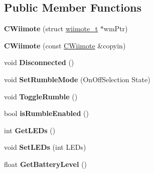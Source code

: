 \subsection*{Public Member Functions}
\begin{DoxyCompactItemize}
\item 
\hypertarget{class_c_wiimote_aea8deb92b4f4c23ff5f619f92f5740bb}{{\bfseries C\-Wiimote} (struct \hyperlink{structwiimote__t}{wiimote\-\_\-t} $\ast$wm\-Ptr)}\label{class_c_wiimote_aea8deb92b4f4c23ff5f619f92f5740bb}

\item 
\hypertarget{class_c_wiimote_af907ec89113a3e2ec6f992bb381c6253}{{\bfseries C\-Wiimote} (const \hyperlink{class_c_wiimote}{C\-Wiimote} \&copyin)}\label{class_c_wiimote_af907ec89113a3e2ec6f992bb381c6253}

\item 
\hypertarget{class_c_wiimote_a39252c75229d1bc9d2acc126304a7ca6}{void {\bfseries Disconnected} ()}\label{class_c_wiimote_a39252c75229d1bc9d2acc126304a7ca6}

\item 
\hypertarget{class_c_wiimote_a4945392c6bcfa461bdcc6b8f5ff25ba1}{void {\bfseries Set\-Rumble\-Mode} (On\-Off\-Selection State)}\label{class_c_wiimote_a4945392c6bcfa461bdcc6b8f5ff25ba1}

\item 
\hypertarget{class_c_wiimote_af1908b383e4a700c270af461bf1b209d}{void {\bfseries Toggle\-Rumble} ()}\label{class_c_wiimote_af1908b383e4a700c270af461bf1b209d}

\item 
\hypertarget{class_c_wiimote_a332038d26d6b67d6a566cc1789bae118}{bool {\bfseries is\-Rumble\-Enabled} ()}\label{class_c_wiimote_a332038d26d6b67d6a566cc1789bae118}

\item 
\hypertarget{class_c_wiimote_a288872e2efc61d986b4b49e4b868460b}{int {\bfseries Get\-L\-E\-Ds} ()}\label{class_c_wiimote_a288872e2efc61d986b4b49e4b868460b}

\item 
\hypertarget{class_c_wiimote_a3526e61d6a51b6fc8406aeca60e92318}{void {\bfseries Set\-L\-E\-Ds} (int L\-E\-Ds)}\label{class_c_wiimote_a3526e61d6a51b6fc8406aeca60e92318}

\item 
\hypertarget{class_c_wiimote_adb0acbb6196d8782790e818b4babfde7}{float {\bfseries Get\-Battery\-Level} ()}\label{class_c_wiimote_adb0acbb6196d8782790e818b4babfde7}


\end{DoxyCompactItemize}
